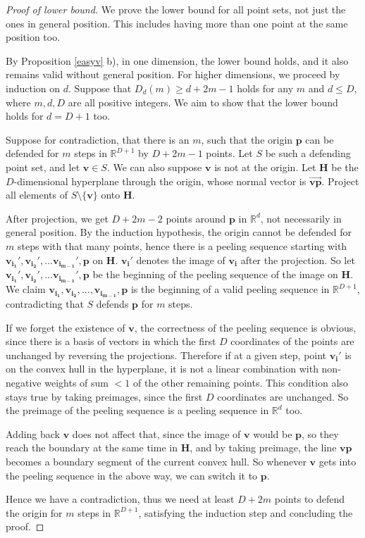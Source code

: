 \documentclass[a4paper,UKenglish,cleveref, autoref, thm-restate]{lipics-v2021}
\def\R{\mathbb{R}}
\def\p{\mathbf{p}}
\begin{document}
    \begin{proof}[Proof of lower bound]
    We prove the lower bound for all point sets, not just the ones in general position. This includes having more than one point at the same position too. 
    
    By Proposition \ref{easyv} b), in one dimension, the lower bound holds, and it also remains valid without general position. For higher dimensions, we proceed by induction on $d$.
    Suppose that $D_d(m)\geq d+2m-1$ holds for any $m$ and $d\leq D$, where $m, d, D$ are all positive integers. We aim to show that the lower bound holds for $d=D+1$ too.

    Suppose for contradiction, that there is an $m$, such that the origin $\p$ can be defended for $m$ steps in $\R^{D+1}$ by $D+2m-1$ points. Let $S$ be such a defending point set, and let $\mathbf{v}\in S$. We can also suppose $\mathbf{v}$ is not at the origin. Let $\mathbf{H}$ be the $D$-dimensional hyperplane through the origin, whose normal vector is $\vec{\mathbf{v}\p}$. Project all elements of $S\setminus\{\mathbf{v}\}$ onto $\mathbf{H}$. 

    After projection, we get $D+2m-2$ points around $\p$ in $\R^d$, not necessarily in general position. By the induction hypothesis, the origin cannot be defended for $m$ steps with that many points, hence there is a peeling sequence starting with $\mathbf{v_{i_1}',v_{i_2}',...v_{i_{m-1}}',p}$ on $\mathbf{H}$. $\mathbf{v_i'}$ denotes the image of $\mathbf{v_i}$ after the projection. So let $\mathbf{v_{i_1}',v_{i_2}',...v_{i_{m-1}}',p}$ be the beginning of the peeling sequence of the image on $\mathbf{H}$.
    We claim $\mathbf{v_{i_1},v_{i_2},...,v_{i_{m-1}},p}$ is the beginning of a valid peeling sequence in $\R^{D+1}$, contradicting that $S$ defends $\p$ for $m$ steps.

    If we forget the existence of $\mathbf{v}$, the correctness of the peeling sequence is obvious, since there is a basis of vectors in which the first $D$ coordinates of the points are unchanged by reversing the projections. Therefore if at a given step, point $\mathbf{v_i'}$ is on the convex hull in the hyperplane, it is not a linear combination with non-negative weights of sum $<1$ of the other remaining points. This condition also stays true by taking preimages, since the first $D$ coordinates are unchanged. So the preimage of the peeling sequence is a peeling sequence in $\R^d$ too.

    Adding back $\mathbf{v}$ does not affect that, since the image of $\mathbf{v}$ would be $\p$, so they reach the boundary at the same time in $\mathbf{H}$, and by taking preimage, the line $\mathbf{vp}$ becomes a boundary segment of the current convex hull. So whenever $\mathbf{v}$ gets into the peeling sequence in the above way, we can switch it to $\p$.

    Hence we have a contradiction, thus we need at least $D+2m$ points to defend the origin for $m$ steps in $\R^{D+1}$, satisfying the induction step and concluding the proof.
    \end{proof}
\end{document}
